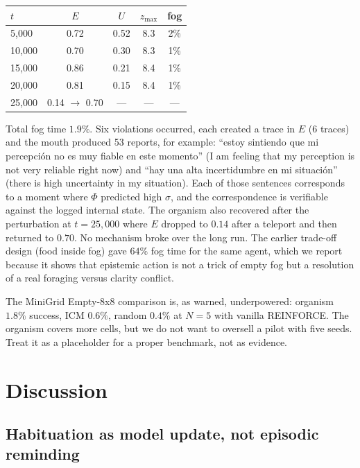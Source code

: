 \documentclass[11pt,a4paper]{article}
\begin{document}
\begin{center}
\begin{tabular}{lcccc}
\toprule
$t$ & $E$ & $U$ & $z_{\max}$ & fog \\
\midrule
5,000 & 0.72 & 0.52 & 8.3 & 2\% \\
10,000 & 0.70 & 0.30 & 8.3 & 1\% \\
15,000 & 0.86 & 0.21 & 8.4 & 1\% \\
20,000 & 0.81 & 0.15 & 8.4 & 1\% \\
25,000 & 0.14 $\rightarrow$ 0.70 & --- & --- & --- \\
\bottomrule
\end{tabular}
\end{center}

Total fog time $1.9\%$. Six violations occurred, each created a trace in $E$ (6 traces) and the mouth produced 53 reports, for example: ``estoy sintiendo que mi percepci\'on no es muy fiable en este momento'' (I am feeling that my perception is not very reliable right now) and ``hay una alta incertidumbre en mi situaci\'on'' (there is high uncertainty in my situation). Each of those sentences corresponds to a moment where $\Phi$ predicted high $\sigma$, and the correspondence is verifiable against the logged internal state. The organism also recovered after the perturbation at $t=25{,}000$ where $E$ dropped to $0.14$ after a teleport and then returned to $0.70$. No mechanism broke over the long run. The earlier trade-off design (food inside fog) gave $64\%$ fog time for the same agent, which we report because it shows that epistemic action is not a trick of empty fog but a resolution of a real foraging versus clarity conflict.

The MiniGrid Empty-8x8 comparison is, as warned, underpowered: organism $1.8\%$ success, ICM $0.6\%$, random $0.4\%$ at $N=5$ with vanilla REINFORCE. The organism covers more cells, but we do not want to oversell a pilot with five seeds. Treat it as a placeholder for a proper benchmark, not as evidence.

\section{Discussion}
\label{sec:discussion}

\subsection{Habituation as model update, not episodic reminding}
\end{document}
